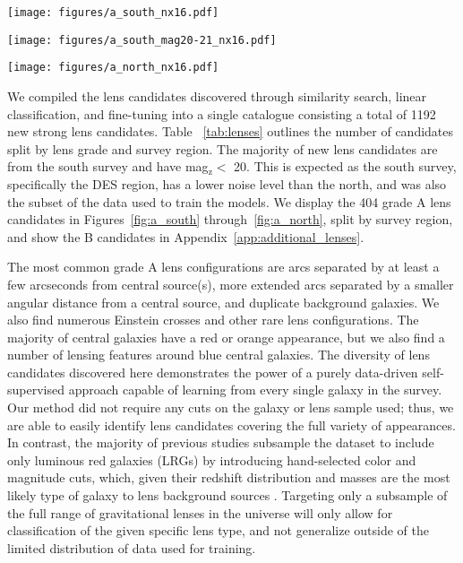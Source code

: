 \documentclass{aastex631}
\newcommand{\zmag}{mag$_{\mathrm{z}}$}
\begin{document}
\begin{figure*}
    \centering
    \texttt{[image: figures/a\_south\_nx16.pdf]}
    \caption{South survey grade A lens candidates with \zmag $<$ 20.}
    \label{fig:a_south}
\end{figure*}

\begin{figure*}
    \centering
    \texttt{[image: figures/a\_south\_mag20-21\_nx16.pdf]}
    \caption{South survey grade A lens candidates with z-band magnitude $>$ 20.}
    \label{fig:a_southmag20-21}
\end{figure*}
\begin{figure*}
    \centering
    \texttt{[image: figures/a\_north\_nx16.pdf]}
    \caption{North survey grade A lens candidates.}
    \label{fig:a_north}
\end{figure*}

We compiled the lens candidates discovered through similarity search, linear classification, and fine-tuning into a single catalogue consisting a total of 1192 new strong lens candidates. Table ~\ref{tab:lenses} outlines the number of candidates split by lens grade and survey region. The majority of new lens candidates are from the south survey and have \zmag $<$ 20. This is expected as the south survey, specifically the DES region, has a lower noise level than the north, and was also the subset of the data used to train the models. We display the 404 grade A lens candidates in Figures~\ref{fig:a_south} through~\ref{fig:a_north}, split by survey region, and show the B candidates in Appendix~\ref{app:additional_lenses}. 



The most common grade A lens configurations are arcs separated by at least a few arcseconds from central source(s), more extended arcs separated by a smaller angular distance from a central source, and duplicate background galaxies. We also find numerous Einstein crosses and other rare lens configurations. The majority of central galaxies have a red or orange appearance, but we also find a number of lensing features around blue central galaxies. The diversity of lens candidates discovered here demonstrates the power of a purely data-driven self-supervised approach capable of learning from every single galaxy in the survey. Our method did not require any cuts on the galaxy or lens sample used; thus, we are able to easily identify lens candidates covering the full variety of appearances. In contrast, the majority of previous studies subsample the dataset to include only luminous red galaxies (LRGs) by introducing hand-selected color and magnitude cuts, which, given their redshift distribution and masses are the most likely type of galaxy to lens background sources \citep{1984ApJ...284....1T}. Targeting only a subsample of the full range of gravitational lenses in the universe will only allow for classification of the given specific lens type, and not generalize outside of the limited distribution of data used for training.      
\end{document}
